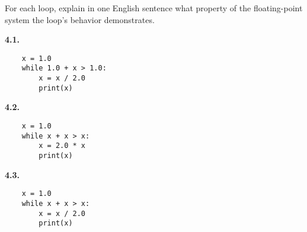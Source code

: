 \documentclass[11pt]{article}
\begin{document}
For each loop, explain in one English
sentence what property of the floating-point system 
the loop's behavior demonstrates.

\par\medskip
{\bf 4.1.}
\begin{verbatim}
    x = 1.0
    while 1.0 + x > 1.0:
        x = x / 2.0
        print(x)
\end{verbatim}

\par\medskip
{\bf 4.2.}
\begin{verbatim}
    x = 1.0
    while x + x > x:
        x = 2.0 * x
        print(x)
\end{verbatim}

\par\medskip
{\bf 4.3.}
\begin{verbatim}
    x = 1.0
    while x + x > x:
        x = x / 2.0
        print(x)
\end{verbatim}
        
\end{document}
